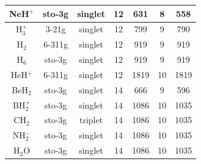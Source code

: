\documentclass[11pt]{article}
\begin{document}
\begin{table}[htbp]
{\begin{tabular}{|| ccccccc ||}
                NeH$^+$ & sto-3g & singlet & 12 & 631 & 8 & 558 \\ [0.5ex] \hline
                H$_3^+$ & 3-21g & singlet & 12 & 799 & 9 & 790 \\ [0.5ex] \hline
                H$_2$ & 6-311g & singlet & 12 & 919 & 9 & 919 \\ [0.5ex] \hline
                H$_6$ & sto-3g & singlet & 12 & 919 & 9 & 919 \\ [0.5ex] \hline
                HeH$^+$ & 6-311g & singlet & 12 & 1819 & 10 & 1819 \\ [0.5ex] \hline
                BeH$_2$ & sto-3g & singlet & 14 & 666 & 9 & 596 \\ [0.5ex] \hline
                BH$_2^+$ & sto-3g & singlet & 14 & 1086 & 10 & 1035 \\ [0.5ex] \hline
                CH$_2$ & sto-3g & triplet & 14 & 1086 & 10 & 1035 \\ [0.5ex] \hline
                NH$_2^-$ & sto-3g & singlet & 14 & 1086 & 10 & 1035 \\ [0.5ex] \hline
                H$_2$O & sto-3g & singlet & 14 & 1086 & 10 & 1035 \\ [0.5ex] \hline
            \end{tabular}
}
\end{table}
\end{document}
